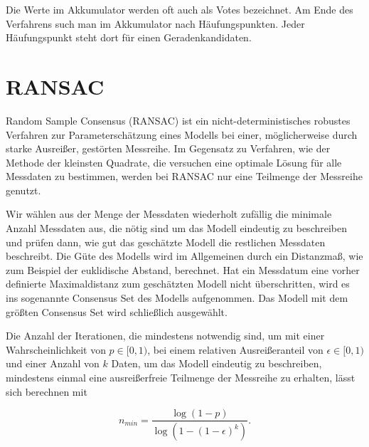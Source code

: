 Die Werte im Akkumulator werden oft auch als Votes bezeichnet. Am Ende des Verfahrens such man im Akkumulator nach Häufungspunkten. Jeder Häufungspunkt steht dort für einen Geradenkandidaten.




\section{RANSAC}
\label{s:ransac}
Random Sample Consensus (RANSAC) \cite{Fischler1981} ist ein nicht-deterministisches robustes Verfahren zur Parameterschätzung eines Modells bei einer, möglicherweise durch starke Ausreißer, gestörten Messreihe.
Im Gegensatz zu Verfahren, wie der Methode der kleinsten Quadrate, die versuchen eine optimale Lösung für alle Messdaten zu bestimmen, werden bei RANSAC nur eine Teilmenge der Messreihe genutzt.

Wir wählen aus der Menge der Messdaten wiederholt zufällig die minimale Anzahl Messdaten aus, die nötig sind um das Modell eindeutig zu beschreiben und prüfen dann, wie gut das geschätzte Modell die restlichen Messdaten beschreibt.
Die Güte des Modells wird im Allgemeinen durch ein Distanzmaß, wie zum Beispiel der euklidische Abstand, berechnet.
Hat ein Messdatum eine vorher definierte Maximaldistanz zum geschätzten Modell nicht überschritten, wird es ins sogenannte Consensus Set des Modells aufgenommen.
Das Modell mit dem größten Consensus Set wird schließlich ausgewählt.

Die Anzahl der Iterationen, die mindestens notwendig sind, um mit einer Wahrscheinlichkeit von $p \in [0,1)$, bei einem relativen Ausreißeranteil von $\epsilon \in[0,1)$ und einer Anzahl von $k$ Daten, um das Modell eindeutig zu beschreiben, mindestens einmal eine ausreißerfreie Teilmenge der Messreihe zu erhalten, lässt sich berechnen mit \cite{Fischler1981}

\begin{equation}
n_{min} = \frac{\log{\left(1-p\right)}}{\log{\left(1-\left(1-\epsilon\right)^k\right)}}.
\end{equation}


